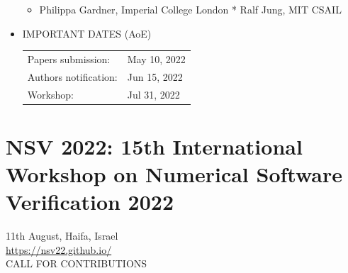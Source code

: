 \documentclass[prodmode,acmtecs]{acmsmall} %
\begin{document}
\begin{itemize}
\begin{itemize}\item  Philippa Gardner, Imperial College London * Ralf Jung, MIT CSAIL
\end{itemize} 
\item  IMPORTANT DATES (AoE)  
 
\begin{tabulary}{\linewidth}{LL}Papers submission:  & May 10, 2022 \\
Authors notification:  & Jun 15, 2022 \\
Workshop:  & Jul 31, 2022 \\
\end{tabulary}
 
\end{itemize}\section{NSV 2022: 15th International Workshop on Numerical Software Verification 2022 }\label{NSV2022}  11th August, Haifa, Israel\\ 
  \href{https://nsv22.github.io/}{https://nsv22.github.io/}\\ 
CALL FOR CONTRIBUTIONS 
\end{document}
